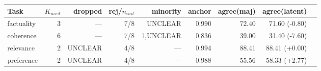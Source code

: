 \begin{tabular}{lrrrrrrrr}
\toprule
Task & $K_{used}$ & dropped & rej/$n_{init}$ & minority & anchor
  & agree(maj) & agree(latent) \\
\midrule
factuality & 3 & — & 7/8 & UNCLEAR & 0.990 & 72.40 & 71.60 \;(-0.80) \\
coherence & 6 & — & 7/8 & 1,UNCLEAR & 0.836 & 39.00 & 31.40 \;(-7.60) \\
relevance & 2 & UNCLEAR & 4/8 & — & 0.994 & 88.41 & 88.41 \;(+0.00) \\
preference & 2 & UNCLEAR & 4/8 & — & 0.988 & 55.56 & 58.33 \;(+2.77) \\
\bottomrule
\end{tabular}
